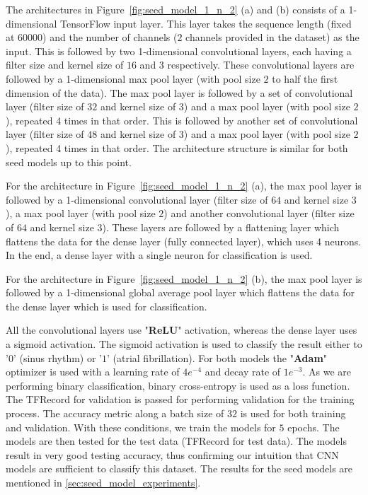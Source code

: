 The architectures in Figure~\ref{fig:seed_model_1_n_2} (a) and (b) consists of a 1-dimensional TensorFlow input layer. This layer takes the sequence length (fixed at $60000$) and the number of channels ($2$ channels provided in the dataset) as the input. This is followed by two 1-dimensional convolutional layers, each having a filter size and kernel size of $16$ and $3$ respectively. These convolutional layers are followed by a 1-dimensional max pool layer (with pool size $2$ to half the first dimension of the data). The max pool layer is followed by a set of convolutional layer (filter size of $32$ and kernel size of $3$) and a max pool layer (with pool size $2$), repeated 4 times in that order. This is followed by another set of convolutional layer (filter size of $48$ and kernel size of $3$) and a max pool layer (with pool size $2$), repeated 4 times in that order. The architecture structure is similar for both seed models up to this point.

For the architecture in Figure~\ref{fig:seed_model_1_n_2} (a), the max pool layer is followed by a 1-dimensional convolutional layer (filter size of $64$ and kernel size $3$), a max pool layer (with pool size $2$) and another convolutional layer (filter size of $64$ and kernel size $3$). These layers are followed by a flattening layer which flattens the data for the dense layer (fully connected layer), which uses 4 neurons. In the end, a dense layer with a single neuron for classification is used.

For the architecture in Figure~\ref{fig:seed_model_1_n_2} (b), the max pool layer is followed by a 1-dimensional global average pool layer which flattens the data for the dense layer which is used for classification.

All the convolutional layers use "\textbf{ReLU}" activation, whereas the dense layer uses a sigmoid activation. The sigmoid activation is used to classify the result either to '$0$' (sinus rhythm) or '$1$' (atrial fibrillation). For both models the "\textbf{Adam}" optimizer is used with a learning rate of \textbf{$4e^{-4}$} and decay rate of \textbf{$1e^{-3}$}. As we are performing binary classification, binary cross-entropy is used as a loss function. The TFRecord for validation is passed for performing validation for the training process. The accuracy metric along a batch size of $32$ is used for both training and validation. With these conditions, we train the models for $5$ epochs. The models are then tested for the test data (TFRecord for test data). The models result in very good testing accuracy, thus confirming our intuition that CNN models are sufficient to classify this dataset. The results for the seed models are mentioned in \autoref{sec:seed_model_experiments}.

